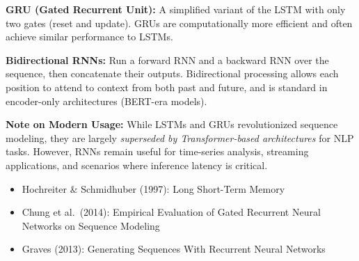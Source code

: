 \textbf{GRU (Gated Recurrent Unit):} A simplified variant of the LSTM with only two gates (reset and update). GRUs are computationally more efficient and often achieve similar performance to LSTMs.

\textbf{Bidirectional RNNs:} Run a forward RNN and a backward RNN over the sequence, then concatenate their outputs. Bidirectional processing allows each position to attend to context from both past and future, and is standard in encoder-only architectures (BERT-era models).

\begin{warnbox}
\textbf{Note on Modern Usage:} While LSTMs and GRUs revolutionized sequence modeling, they are largely \emph{superseded by Transformer-based architectures} for NLP tasks. However, RNNs remain useful for time-series analysis, streaming applications, and scenarios where inference latency is critical.
\end{warnbox}

\begin{paperbox}[title={References: RNNs and LSTMs}]
\begin{itemize}
  \item Hochreiter \& Schmidhuber (1997): Long Short-Term Memory
  \item Chung et al.~(2014): Empirical Evaluation of Gated Recurrent Neural Networks on Sequence Modeling
  \item Graves (2013): Generating Sequences With Recurrent Neural Networks
\end{itemize}
\end{paperbox}

